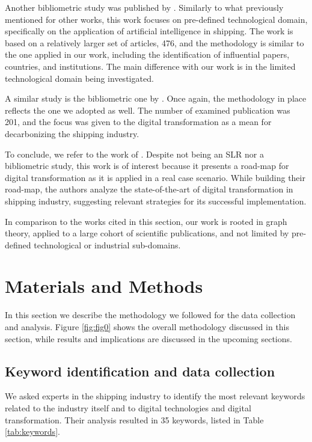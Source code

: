 \documentclass[jmse,review,submit,pdftex,moreauthors]{Definitions/mdpi}
\begin{document}
Another bibliometric study was published by \citep{xiao2024application}. Similarly to what previously mentioned for other works, this work focuses on pre-defined technological domain, specifically on the application of artificial intelligence in shipping. The work is based on a relatively larger set of articles, 476, and the methodology is similar to the one applied in our work, including the identification of influential papers, countries, and institutions. The main difference with our work is in the limited technological domain being investigated.

A similar study is the bibliometric one by \citep{xiao2025application}. Once again, the methodology in place reflects the one we adopted as well. The number of examined publication was 201, and the focus was given to the digital transformation as a mean for decarbonizing the shipping industry.

To conclude, we refer to the work of \citep{filippopoulos2022road}. Despite not being an SLR nor a bibliometric study, this work is of interest because it presents a road-map for digital transformation as it is applied in a real case scenario. While building their road-map, the authors analyze the state-of-the-art of digital transformation in shipping industry, suggesting relevant strategies for its successful implementation.

In comparison to the works cited in this section, our work is rooted in graph theory, applied to a large cohort of scientific publications, and not limited by pre-defined technological or industrial sub-domains.

\section{Materials and Methods}
In this section we describe the methodology we followed for the data collection and analysis. Figure \ref{fig:fig0} shows the overall methodology discussed in this section, while results and implications are discussed in the upcoming sections.

\subsection{Keyword identification and data collection}
We asked experts in the shipping industry to identify the most relevant keywords related to the industry itself and to digital technologies and digital transformation. Their analysis resulted in 35 keywords, listed in Table \ref{tab:keywords}.
\end{document}
